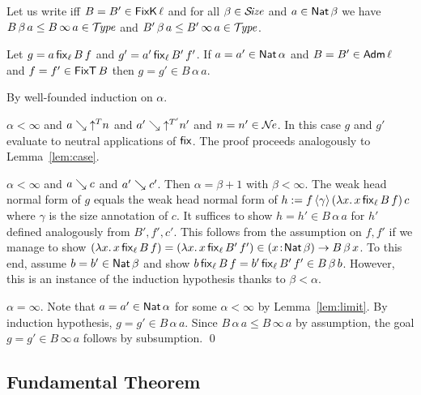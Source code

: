 \documentclass[acmlarge,review,anonymous]{acmart}\settopmatter{printfolios=true}
\makeatletter
\newenvironment{proof*}[1][\proofname]{\par
  \normalfont \topsep6\p@\@plus6\p@\relax
  \trivlist
  \item[\@proofindent\hskip\labelsep
        {\@proofnamefont #1\@addpunct{.}}]\ignorespaces
}{%
  \endtrivlist\@endpefalse
}
\makeatother
\begin{document}
Let us write  iff $B = B' \in \FixK\,\ell$ and
for all $\beta \in \SIZE$ and $a \in \Nat \beta$ we have
$B\,\beta\, a \leq B\,\infty\,a \in \TYPE$ and
$B'\,\beta\, a \leq B'\,\infty\,a \in \TYPE$.
\begin{lemma}[Fix]
Let $g = a \, \fix[\ell] B f$ and $g' = a'\,\fix[\ell]{B'}{f'}$.
If\/ $a = a' \in \Nat \alpha$
and $B = B' \in \Adm\ell$
and $f = f' \in \FixT\,B$
then $g = g' \in B\,\alpha\,a$.
\end{lemma}
\begin{proof*}
By well-founded induction on $\alpha$.
\begin{caselist}

\nextcase $\alpha < \infty$ and $a \evalsto \up{T}n$ and $a' \evalsto \up{T'}{n'}$ and $n = n' \in \NE$.
In this case $g$ and $g'$ evaluate to neutral applications of $\tfix$.  The proof proceeds analogously to Lemma~\ref{lem:case}.

\nextcase $\alpha < \infty$ and $a \evalsto c$ and $a' \evalsto c'$.  Then $\alpha = \beta + 1$ with $\beta<\infty$.
The weak head normal form of $g$ equals the weak head normal form of
$h := f\,\ann \gamma\,(\lambda x.\,x\,\fix[\ell] B f)\,c$ where $\gamma$ is the size annotation of $c$.
It suffices to show $h = h' \in B\,\alpha\,a$ for $h'$ defined analogously from $B',f',c'$.
This follows from the assumption on $f, f'$ if we manage to show
$(\lambda x.\,x\,\fix[\ell] B f) = (\lambda x.\,x\,\fix[\ell] {B'} {f'}) \in
\funT x {\Nat\beta} {B\,\beta\,x}$.
To this end, assume $b = b' \in \Nat\beta$ and show
$b\,\fix[\ell] B f = b'\,\fix[\ell] {B'} {f'} \in B\,\beta\,b$.
However, this is an instance of the induction hypothesis thanks to $\beta < \alpha$.


\nextcase $\alpha = \infty$.
Note that $a = a' \in \Nat \alpha$ for some $\alpha < \infty$ by Lemma~\ref{lem:limit}.
By induction hypothesis, $g = g' \in B\,\alpha\,a$.  Since
$B\,\alpha\,a \leq B\,\infty\,a$ by assumption, the goal
$g = g' \in B\,\infty\,a$ follows by subsumption.
\qed
\end{caselist}
\end{proof*}

\subsection{Fundamental Theorem}
\label{sec:fund}
\end{document}
